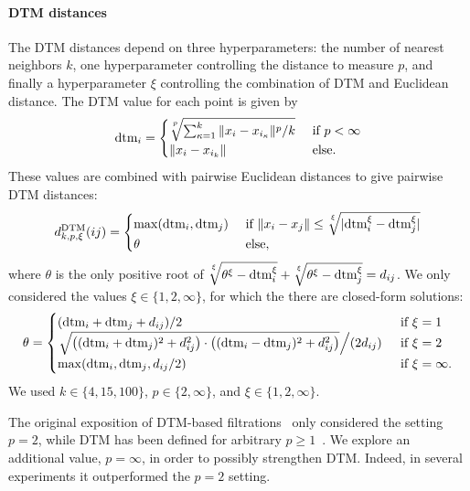 \documentclass{article}
\theoremstyle{plain}
\theoremstyle{definition}
\theoremstyle{remark}
\begin{document}
\paragraph{DTM distances}
The DTM distances depend on three hyperparameters: the number of nearest neighbors $k$, one hyperparameter controlling the distance to measure $p$, and finally a hyperparameter $\xi$ controlling the combination of DTM and Euclidean distance. The DTM value for each point is given by
\begin{equation}
    \text{dtm}_i = \begin{cases}
        \sqrt[\uproot{5} p]{\sum_{\kappa=1}^k  \| x_i - x_{i_\kappa}\|^{p}/k} &\text{ if } p < \infty \\
        \| x_i - x_{i_k}\| &\text{ else}.
    \end{cases}
\end{equation}
These values are combined with pairwise Euclidean distances to give pairwise DTM distances:
\begin{equation}
    d^{\text{DTM}}_{k,p,\xi}(ij) = \begin{cases}
        \max(\text{dtm}_i, \text{dtm}_j) &\text{ if } \| x_i - x_j\|\leq \sqrt[\uproot{5} \xi]{|\text{dtm}_i^{\xi} - \text{dtm}_j^{\xi}|}\\
        \theta &\text{ else},
    \end{cases}
\end{equation}
where $\theta$ is the only positive root of $\sqrt[\uproot{5}\xi]{\theta^{\xi} - \text{dtm}_i^{\xi}} + \sqrt[\uproot{5}\xi]{\theta^{\xi} - \text{dtm}_j^{\xi}} = d_{ij}$. We only considered the values $\xi \in \{1, 2, \infty\}$, for which the there are closed-form solutions:
\begin{equation}
    \theta = \begin{cases}
        (\text{dtm}_i + \text{dtm}_j + d_{ij})/2 &\text{ if } \xi = 1 \\
        \left. \sqrt{\big((\text{dtm}_i+\text{dtm}_j)^2 + d_{ij}^2\big)\cdot\big((\text{dtm}_i-\text{dtm}_j)^2 + d_{ij}^2\big)} \middle/ (2d_{ij})\right. &\text{ if } \xi = 2 \\
        \max(\text{dtm}_i, \text{dtm}_j, d_{ij}/2) &\text{ if } \xi = \infty.
    \end{cases}
\end{equation}
We used $k\in \{4, 15, 100\}$, $p \in \{2, \infty\}$, and $\xi\in\{1, 2,\infty\}$.

The original exposition of DTM-based filtrations~\cite{anai2020dtm} only considered the setting $p=2$, while DTM has been defined for arbitrary $p\geq 1$~\cite{chazal2021introduction}. We explore an additional value, $p=\infty$, in order to possibly strengthen DTM. Indeed, in several experiments it outperformed the $p=2$ setting.
\end{document}
